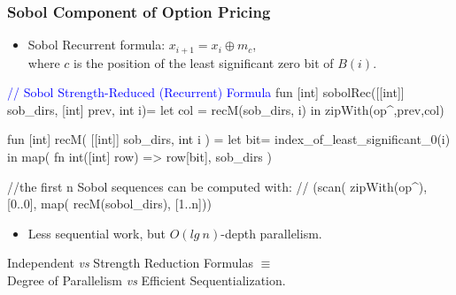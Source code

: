 \documentclass{beamer}
\newcommand{\blue}[1]{\textcolor{Blue}{{#1}}}
\newcommand{\emp}[1]{\textcolor{DikuRed}{ #1}}
\newcommand{\emphh}[1]{\textcolor{CosGreen}{ #1}}
\begin{document}
\begin{frame}[fragile,t]
  \frametitle{Sobol Component of Option Pricing}

\begin{itemize}
    \item Sobol Recurrent   formula: $x_{i+1} = x_{i} \oplus m_c$,\\ 
            where $c$ is the position of the least significant zero bit of $B(i)$.\bigskip
\end{itemize}


\begin{colorcode}
\blue{// Sobol Strength-Reduced (Recurrent) Formula}
fun [int] sobolRec([[int]] sob_dirs, [int] prev, int i)=
        let col = \emp{recM}(sob_dirs, i) in \emphh{zipWith}(op^,prev,col)

fun [int] \emp{recM}( [[int]] sob_dirs, int i ) =
        let bit= index_of_least_significant_0(i) in
        \emphh{map}( fn int([int] row) => row[bit], sob_dirs )

//the first n Sobol sequences can be computed with:
//\emp{(scan( zipWith(op^), [0..0], map( recM(sobol_dirs), [1..n]))}
\end{colorcode}
\smallskip

\begin{itemize}
    \item \emphh{Less sequential work}, but \emp{$O(lg~n)$-depth parallelism}. \bigskip
\end{itemize}

Independent {\em vs} Strength Reduction Formulas $\equiv$\\
Degree of Parallelism {\em vs} Efficient Sequentialization. 

\end{frame}
\end{document}
